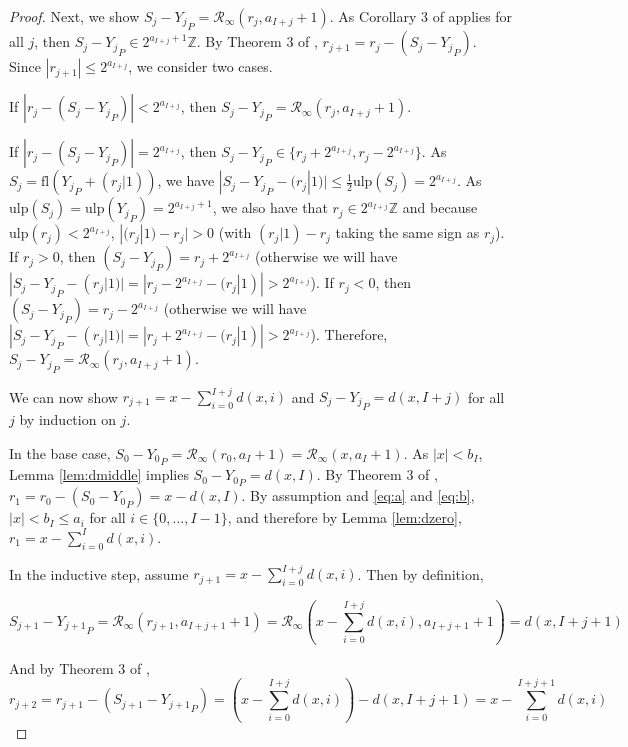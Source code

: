 \documentclass[12pt]{article}
\providecommand{\Z}{\ensuremath{\mathbb{Z}}}
\providecommand{\ulp}{\ensuremath{\text{ulp}}}
\providecommand{\fl}{\ensuremath{\text{fl}}}
\providecommand{\roundtonearestinfty}{\ensuremath{\mathcal{R}_\text{$\infty$}}}
\theoremstyle{definition}
\numberwithin{equation}{section}
\numberwithin{figure}{section}
\begin{document}
\begin{proof}
        Next, we show $S_j - {Y_j}_P = \roundtonearestinfty(r_j, a_{I + j} + 1)$. As Corollary 3 of \cite{repsum} applies for all $j$, then $S_j - {Y_j}_P \in 2^{a_{I + j} + 1}\Z$. By Theorem 3 of \cite{repsum}, $r_{j + 1} = r_j - (S_j - {Y_j}_P)$. Since $|r_{j + 1}| \leq 2^{a_{I + j}}$, we consider two cases.

        If $|r_j - (S_j - {Y_j}_P)| < 2^{a_{I + j}}$, then $S_j - {Y_j}_P = \roundtonearestinfty(r_j, a_{I + j} + 1)$.

        If $|r_j - (S_j - {Y_j}_P)| = 2^{a_{I + j}}$, then $S_j - {Y_j}_P \in \{r_j + 2^{a_{I + j}},  r_j - 2^{a_{I + j}}\}$.
        As $S_j = \fl({Y_j}_P + (r_j|1))$, we have $|S_j - {Y_j}_P - (r_j|1)| \leq \frac{1}{2}\ulp(S_j) = 2^{a_{I + j}}$.  As $\ulp(S_j) = \ulp({Y_j}_P) = 2^{a_{I + j} + 1}$, we also have that $r_j \in 2^{a_{I + j}}\Z$  and because $\ulp(r_j) < 2^{a_{I + j}}$, $|(r_j|1) - r_j| > 0$ (with $(r_j|1) - r_j$ taking the same sign as $r_j$).
        If $r_j > 0$, then $(S_j - {Y_j}_P) = r_j + 2^{a_{I + j}}$ (otherwise we will have $|S_j - {Y_j}_P - (r_j|1)| = |r_j - 2^{a_{I + j}} - (r_j|1)| > 2^{a_{I + j}}$).
        If $r_j < 0$, then $(S_j - {Y_j}_P) = r_j - 2^{a_{I + j}}$ (otherwise we will have $|S_j - {Y_j}_P - (r_j|1)| = |r_j + 2^{a_{I + j}} - (r_j|1)| > 2^{a_{I + j}}$). Therefore, $S_j - {Y_j}_P = \roundtonearestinfty(r_j, a_{I + j} + 1)$.

        We can now show $r_{j + 1} = x - \sum\limits_{i = 0}^{I + j}d(x, i)$ and $S_j - {Y_j}_P = d(x, I + j)$ for all $j$ by induction on $j$.

        In the base case, $S_0 - {Y_0}_P = \roundtonearestinfty(r_0, a_I + 1) = \roundtonearestinfty(x, a_I + 1)$. As $|x| < b_I$, Lemma \ref{lem:dmiddle} implies $S_0 - {Y_0}_P = d(x, I)$. By Theorem 3 of \cite{repsum}, $r_1 = r_0 - (S_0 - {Y_0}_P) = x - d(x,I)$. By assumption and  \eqref{eq:a} and \eqref{eq:b}, $|x| < b_I \leq a_{i}$ for all $i \in \{0, ..., I - 1\}$, and therefore by Lemma \ref{lem:dzero}, $r_1 = x - \sum\limits_{i = 0}^Id(x, i)$.

        In the inductive step, assume $r_{j + 1} = x - \sum\limits_{i = 0}^{I + j}d(x, i)$. Then by definition,

        \begin{equation*}
          S_{j + 1} - {Y_{j + 1}}_P = \roundtonearestinfty(r_{j + 1}, a_{I + j + 1} + 1) = \roundtonearestinfty(x - \sum\limits_{i = 0}^{I + j}d(x, i), a_{I + j + 1} + 1) = d(x, I + j + 1)
        \end{equation*}

        And by Theorem 3 of \cite{repsum},
        \begin{equation*}
          r_{j + 2} = r_{j + 1} - (S_{j + 1} - {Y_{j + 1}}_P) = (x - \sum\limits_{i = 0}^{I + j}d(x, i)) - d(x, I + j + 1) = x - \sum\limits_{i = 0}^{I + j + 1}d(x, i)
        \end{equation*}
      \end{proof}
\end{document}
